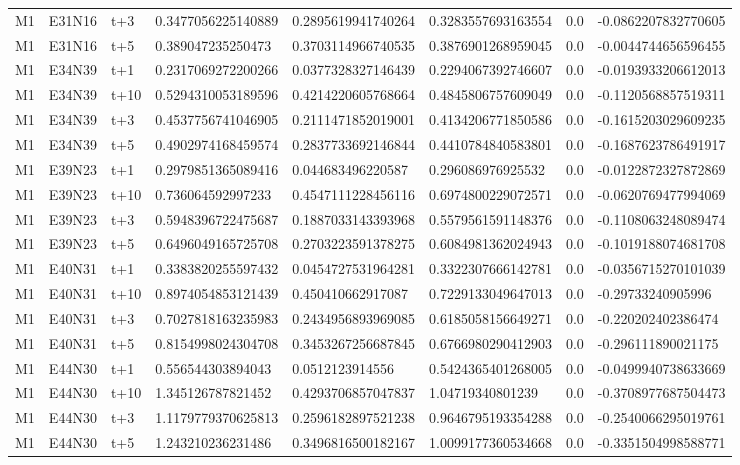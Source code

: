 \begin{landscape}
\begin{longtable}{llllllll}
M1 & E31N16 & t+3 & 0.3477056225140889 & 0.2895619941740264 & 0.3283557693163554 & 0.0 & -0.0862207832770605 \\
M1 & E31N16 & t+5 & 0.389047235250473 & 0.3703114966740535 & 0.3876901268959045 & 0.0 & -0.0044744656596455 \\
M1 & E34N39 & t+1 & 0.2317069272200266 & 0.0377328327146439 & 0.2294067392746607 & 0.0 & -0.0193933206612013 \\
M1 & E34N39 & t+10 & 0.5294310053189596 & 0.4214220605768664 & 0.4845806757609049 & 0.0 & -0.1120568857519311 \\
M1 & E34N39 & t+3 & 0.4537756741046905 & 0.2111471852019001 & 0.4134206771850586 & 0.0 & -0.1615203029609235 \\
M1 & E34N39 & t+5 & 0.4902974168459574 & 0.2837733692146844 & 0.4410784840583801 & 0.0 & -0.1687623786491917 \\
M1 & E39N23 & t+1 & 0.2979851365089416 & 0.044683496220587 & 0.296086976925532 & 0.0 & -0.0122872327872869 \\
M1 & E39N23 & t+10 & 0.736064592997233 & 0.4547111228456116 & 0.6974800229072571 & 0.0 & -0.0620769477994069 \\
M1 & E39N23 & t+3 & 0.5948396722475687 & 0.1887033143393968 & 0.5579561591148376 & 0.0 & -0.1108063248089474 \\
M1 & E39N23 & t+5 & 0.6496049165725708 & 0.2703223591378275 & 0.6084981362024943 & 0.0 & -0.1019188074681708 \\
M1 & E40N31 & t+1 & 0.3383820255597432 & 0.0454727531964281 & 0.3322307666142781 & 0.0 & -0.0356715270101039 \\
M1 & E40N31 & t+10 & 0.8974054853121439 & 0.450410662917087 & 0.7229133049647013 & 0.0 & -0.29733240905996 \\
M1 & E40N31 & t+3 & 0.7027818163235983 & 0.2434956893969085 & 0.6185058156649271 & 0.0 & -0.220202402386474 \\
M1 & E40N31 & t+5 & 0.8154998024304708 & 0.3453267256687845 & 0.6766980290412903 & 0.0 & -0.296111890021175 \\
M1 & E44N30 & t+1 & 0.556544303894043 & 0.0512123914556 & 0.5424365401268005 & 0.0 & -0.0499940738633669 \\
M1 & E44N30 & t+10 & 1.345126787821452 & 0.4293706857047837 & 1.04719340801239 & 0.0 & -0.3708977687504473 \\
M1 & E44N30 & t+3 & 1.1179779370625813 & 0.2596182897521238 & 0.9646795193354288 & 0.0 & -0.2540066295019761 \\
M1 & E44N30 & t+5 & 1.243210236231486 & 0.3496816500182167 & 1.0099177360534668 & 0.0 & -0.3351504998588771 \\

\end{longtable}
\end{landscape}
